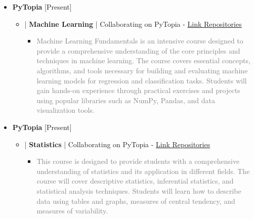 \documentclass[10pt,a4paper,sans]{moderncv} %
\begin{document}
             \begin{itemize}
		\item {} \textbf{PyTopia } \hfill[Present]   
		\vspace{0.5em}

      \begin{itemize}
       \item{} | \textbf{Machine Learning} | Collaborating on PyTopia - \href{https://github.com/pytopia}{Link Repositories}
        
		\begin{itemize}
			\item \textcolor{gray}{Machine Learning Fundamentals is an intensive course designed to provide a comprehensive understanding of the core principles and techniques in machine learning. The course covers essential concepts, algorithms, and tools necessary for building and evaluating machine learning models for regression and classification tasks. Students will gain hands-on experience through practical exercises and projects using popular libraries such as NumPy, Pandas, and data visualization tools.}


   

			\end{itemize}	
				
		\end{itemize}
  
		\end{itemize}


               \begin{itemize}
		\item {} \textbf{PyTopia }   \hfill[Present]  
		\vspace{0.5em}

      \begin{itemize}
       \item{} | \textbf{Statistics} | Collaborating on PyTopia  - \href{https://github.com/pytopia}{Link Repositories} 
        
		\begin{itemize}
			\item \textcolor{gray}{This course is designed to provide students with a comprehensive understanding of statistics and its application in different fields. The course will cover descriptive statistics, inferential statistics, and statistical analysis techniques. Students will learn how to describe data using tables and graphs, measures of central tendency, and measures of variability.}
			\end{itemize}	
				
		\end{itemize}
  
		\end{itemize}
\end{document}
